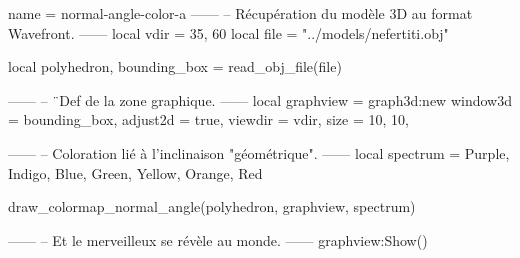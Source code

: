 \documentclass{standalone}
\begin{document}
\begin{luadraw}{name = normal-angle-color-a}
------
-- Récupération du modèle 3D au format Wavefront.
------
local vdir = {35, 60}
local file = "../models/nefertiti.obj"

local polyhedron, bounding_box = read_obj_file(file)

------
-- ¨Def de la zone graphique.
------
local graphview = graph3d:new{
  window3d = bounding_box,
  adjust2d = true,
  viewdir  = vdir,
  size     = {10, 10},
}

------
-- Coloration lié à l'inclinaison "géométrique".
------
local spectrum = {Purple, Indigo, Blue, Green, Yellow, Orange, Red}

draw_colormap_normal_angle(polyhedron, graphview, spectrum)

------
-- Et le merveilleux se révèle au monde.
------
graphview:Show()
\end{luadraw}
\end{document}
